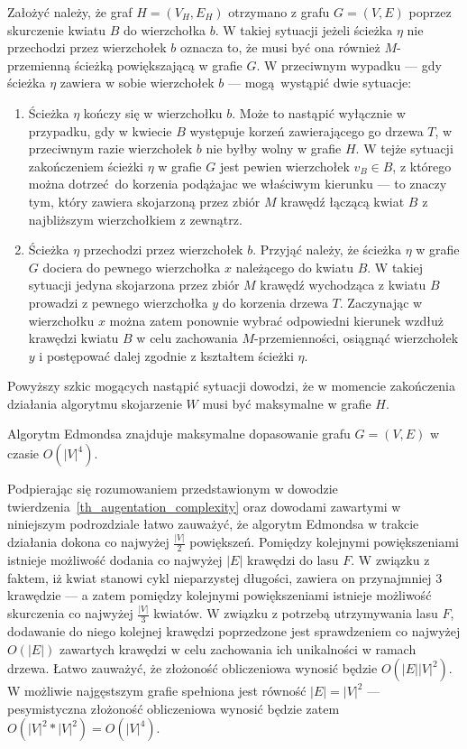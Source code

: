 {\begin{bproof}
    Założyć należy, że graf $H=(V_H, E_H)$ otrzymano z grafu $G=(V, E)$ poprzez skurczenie kwiatu $B$ do wierzchołka $b$.
    W takiej sytuacji jeżeli ścieżka $\eta$ nie przechodzi przez wierzchołek $b$ oznacza to, że musi być ona również $M$-przemienną ścieżką powiększającą w grafie $G$. W przeciwnym wypadku --- gdy ścieżka $\eta$ zawiera w sobie wierzchołek $b$ --- mogą wystąpić dwie sytuacje:
    \begin{enumerate}
      \item Ścieżka $\eta$ kończy się w wierzchołku $b$.
      Może to nastąpić wyłącznie w przypadku, gdy w kwiecie $B$ występuje korzeń zawierającego go drzewa $T$, w przeciwnym razie wierzchołek $b$ nie byłby wolny w grafie $H$.
      W tejże sytuacji zakończeniem ścieżki $\eta$ w grafie $G$ jest pewien wierzchołek $v_B \in B$, z którego można dotrzeć do korzenia podążajac we właściwym kierunku --- to znaczy tym, który zawiera skojarzoną przez zbiór $M$ krawędź łączącą kwiat $B$ z najbliższym wierzchołkiem z zewnątrz.
      \item Ścieżka $\eta$ przechodzi przez wierzchołek $b$.
      Przyjąć należy, że ścieżka $\eta$ w grafie $G$ dociera do pewnego wierzchołka $x$ należącego do kwiatu $B$.
      W takiej sytuacji jedyna skojarzona przez zbiór $M$ krawędź wychodząca z kwiatu $B$ prowadzi z pewnego wierzchołka $y$ do korzenia drzewa $T$.
      Zaczynając w wierzchołku $x$ można zatem ponownie wybrać odpowiedni kierunek wzdłuż krawędzi kwiatu $B$ w celu zachowania $M$-przemienności, osiągnąć wierzchołek $y$ i postępować dalej zgodnie z kształtem ścieżki $\eta$.
    \end{enumerate}

    Powyższy szkic mogących nastąpić sytuacji dowodzi, że w momencie zakończenia działania algorytmu skojarzenie $W$ musi być maksymalne w grafie $H$.
  \end{bproof}
  \begin{theorem}
    Algorytm Edmondsa znajduje maksymalne dopasowanie grafu $G=(V, E)$ w czasie $O(|V|^4)$.
  \end{theorem}
  \begin{bproof}
    Podpierając się rozumowaniem przedstawionym w dowodzie twierdzenia~\ref{th_augentation_complexity} oraz dowodami zawartymi w niniejszym podrozdziale łatwo zauważyć, że algorytm Edmondsa w trakcie działania dokona co najwyżej $\frac{|V|}{2}$ powiększeń.
    Pomiędzy kolejnymi powiększeniami istnieje możliwość dodania co najwyżej $|E|$ krawędzi do lasu $F$.
    W związku z faktem, iż kwiat stanowi cykl nieparzystej długości, zawiera on przynajmniej 3 krawędzie --- a zatem pomiędzy kolejnymi powiększeniami istnieje możliwość skurczenia co najwyżej $\frac{|V|}{3}$ kwiatów.
    W związku z potrzebą utrzymywania lasu $F$, dodawanie do niego kolejnej krawędzi poprzedzone jest sprawdzeniem co najwyżej $O(|E|)$ zawartych krawędzi w celu zachowania ich unikalności w ramach drzewa.
    Łatwo zauważyć, że złożoność obliczeniowa wynosić będzie $O(|E||V|^2)$.
    W możliwie najgęstszym grafie spełniona jest równość $|E|=|V|^2$ --- pesymistyczna złożoność obliczeniowa wynosić będzie zatem $O(|V|^2*|V|^2)=O(|V|^4)$.
  \end{bproof}
}